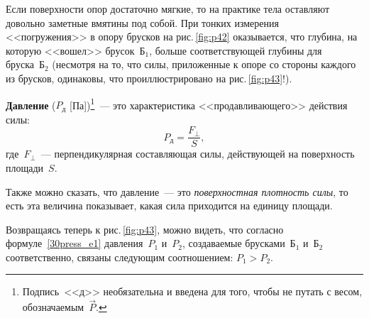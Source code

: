 \documentclass[main.tex]{subfiles}
\begin{document}
Если поверхности опор достаточно мягкие, то на практике тела оставляют довольно заметные вмятины под собой. При тонких измерения <<погружения>> в опору брусков на рис.\,\ref{fig:p42} оказывается, что глубина, на которую <<вошел>> брусок~Б$_1$, больше соответствующей глубины для бруска~Б$_2$ (несмотря на то, что силы, приложенные к опоре со стороны каждого из брусков, одинаковы, что проиллюстрировано на рис.\,\ref{fig:p43}!).

\textbf{Давление} ($P_\text{д}$ [Па])\footnote{Подпись~<<д>> необязательна и введена для того, чтобы не путать с весом, обозначаемым~$\vec P$.}~--- это характеристика <<продавливающего>> действия силы:
\begin{equation}\label{30press_e1}
    P_\text{д}=\frac{F_\perp}{S},
\end{equation}
где~$F_\perp$~--- перпендикулярная составляющая силы, действующей на поверхность площади~$S$.

Также можно сказать, что давление~--- это \emph{поверхностная плотность силы}, то есть эта величина показывает, какая сила приходится на единицу площади.

Возвращаясь теперь к рис.\,\ref{fig:p43}, можно видеть, что согласно формуле~\eqref{30press_e1} давления~$P_1$ и~$P_2$, создаваемые брусками~Б$_1$ и~Б$_2$ соответственно, связаны следующим соотношением: $P_1>P_2$.











 
\end{document}
